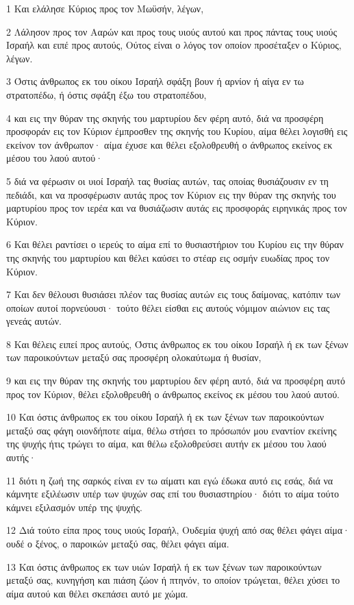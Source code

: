 \par 1 Και ελάλησε Κύριος προς τον Μωϋσήν, λέγων,
\par 2 Λάλησον προς τον Ααρών και προς τους υιούς αυτού και προς πάντας τους υιούς Ισραήλ και ειπέ προς αυτούς, Ούτος είναι ο λόγος τον οποίον προσέταξεν ο Κύριος, λέγων.
\par 3 Όστις άνθρωπος εκ του οίκου Ισραήλ σφάξη βουν ή αρνίον ή αίγα εν τω στρατοπέδω, ή όστις σφάξη έξω του στρατοπέδου,
\par 4 και εις την θύραν της σκηνής του μαρτυρίου δεν φέρη αυτό, διά να προσφέρη προσφοράν εις τον Κύριον έμπροσθεν της σκηνής του Κυρίου, αίμα θέλει λογισθή εις εκείνον τον άνθρωπον· αίμα έχυσε και θέλει εξολοθρευθή ο άνθρωπος εκείνος εκ μέσου του λαού αυτού·
\par 5 διά να φέρωσιν οι υιοί Ισραήλ τας θυσίας αυτών, τας οποίας θυσιάζουσιν εν τη πεδιάδι, και να προσφέρωσιν αυτάς προς τον Κύριον εις την θύραν της σκηνής του μαρτυρίου προς τον ιερέα και να θυσιάζωσιν αυτάς εις προσφοράς ειρηνικάς προς τον Κύριον.
\par 6 Και θέλει ραντίσει ο ιερεύς το αίμα επί το θυσιαστήριον του Κυρίου εις την θύραν της σκηνής του μαρτυρίου και θέλει καύσει το στέαρ εις οσμήν ευωδίας προς τον Κύριον.
\par 7 Και δεν θέλουσι θυσιάσει πλέον τας θυσίας αυτών εις τους δαίμονας, κατόπιν των οποίων αυτοί πορνεύουσι· τούτο θέλει είσθαι εις αυτούς νόμιμον αιώνιον εις τας γενεάς αυτών.
\par 8 Και θέλεις ειπεί προς αυτούς, Όστις άνθρωπος εκ του οίκου Ισραήλ ή εκ των ξένων των παροικούντων μεταξύ σας προσφέρη ολοκαύτωμα ή θυσίαν,
\par 9 και εις την θύραν της σκηνής του μαρτυρίου δεν φέρη αυτό, διά να προσφέρη αυτό προς τον Κύριον, θέλει εξολοθρευθή ο άνθρωπος εκείνος εκ μέσου του λαού αυτού.
\par 10 Και όστις άνθρωπος εκ του οίκου Ισραήλ ή εκ των ξένων των παροικούντων μεταξύ σας φάγη οιονδήποτε αίμα, θέλω στήσει το πρόσωπόν μου εναντίον εκείνης της ψυχής ήτις τρώγει το αίμα, και θέλω εξολοθρεύσει αυτήν εκ μέσου του λαού αυτής·
\par 11 διότι η ζωή της σαρκός είναι εν τω αίματι και εγώ έδωκα αυτό εις εσάς, διά να κάμνητε εξιλέωσιν υπέρ των ψυχών σας επί του θυσιαστηρίου· διότι το αίμα τούτο κάμνει εξιλασμόν υπέρ της ψυχής.
\par 12 Διά τούτο είπα προς τους υιούς Ισραήλ, Ουδεμία ψυχή από σας θέλει φάγει αίμα· ουδέ ο ξένος, ο παροικών μεταξύ σας, θέλει φάγει αίμα.
\par 13 Και όστις άνθρωπος εκ των υιών Ισραήλ ή εκ των ξένων των παροικούντων μεταξύ σας, κυνηγήση και πιάση ζώον ή πτηνόν, το οποίον τρώγεται, θέλει χύσει το αίμα αυτού και θέλει σκεπάσει αυτό με χώμα.
